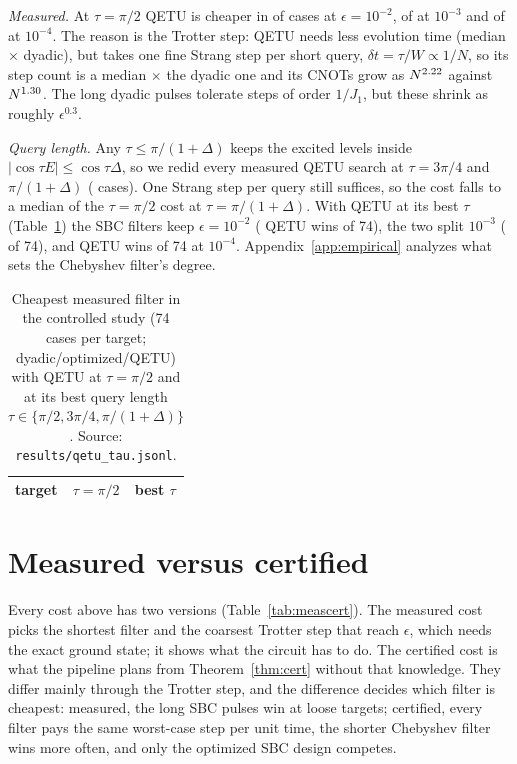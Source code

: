 \documentclass[aps,pra,twocolumn,superscriptaddress,nofootinbib]{revtex4-2}
\begin{document}
\emph{Measured.} At $\tau=\pi/2$ QETU is cheaper in \goQetuWinsTwo{} of \goCasesTwo{} cases at $\epsilon=10^{-2}$,
\goQetuWinsThree{} of \goCasesThree{} at $10^{-3}$ and \goQetuWinsFour{} of \goCasesFour{} at $10^{-4}$. The reason
is the Trotter step: QETU needs less evolution time (median \fQDtime$\times$ dyadic), but takes one fine Strang step
per short query, $\delta t=\tau/W\propto1/N$, so its step count is a median \fQDsteps$\times$ the dyadic one and its
CNOTs grow as $N^{2.22}$ against $N^{1.30}$. The long dyadic pulses tolerate steps of order $1/J_1$, but
these shrink as roughly $\epsilon^{0.3}$.

\emph{Query length.} Any $\tau\le\pi/(1+\Delta)$ keeps the excited levels inside $|\cos\tau E|\le\cos\tau\Delta$, so
we redid every measured QETU search at $\tau=3\pi/4$ and $\pi/(1+\Delta)$ (\tauNcases{} cases). One Strang step per
query still suffices, so the cost falls to a median \tauPiMed{} of the $\tau=\pi/2$ cost at $\tau=\pi/(1+\Delta)$.
With QETU at its best $\tau$ (Table~\ref{tab:qetutau}) the SBC filters keep $\epsilon=10^{-2}$ (\tauBestQeTwo{}
QETU wins of 74), the two split $10^{-3}$ (\tauBestQeThree{} of 74), and QETU wins \tauBestQeFour{} of 74 at
$10^{-4}$. Appendix~\ref{app:empirical} analyzes what sets the Chebyshev filter's degree.

\begin{table}[t]
\caption{Cheapest measured filter in the controlled study (74 cases per target; dyadic/optimized/QETU) with QETU at
$\tau=\pi/2$ and at its best query length $\tau\in\{\pi/2,3\pi/4,\pi/(1+\Delta)\}$. Source:
\texttt{results/qetu\_tau.jsonl}.}
\label{tab:qetutau}
\begin{ruledtabular}
\begin{tabular}{lll}
target & $\tau=\pi/2$ & best $\tau$\\
\midrule

\end{tabular}
\end{ruledtabular}
\end{table}

\section{Measured versus certified}
\label{sec:meascert}

Every cost above has two versions (Table~\ref{tab:meascert}). The measured cost picks the shortest filter and the
coarsest Trotter step that reach $\epsilon$, which needs the exact ground state; it shows what the circuit has to do.
The certified cost is what the pipeline plans from Theorem~\ref{thm:cert} without that knowledge. They differ mainly
through the Trotter step, and the difference decides which filter is cheapest: measured, the long SBC pulses win at
loose targets; certified, every filter pays the same worst-case step per unit time, the shorter Chebyshev filter
wins more often, and only the optimized SBC design competes.
\end{document}
